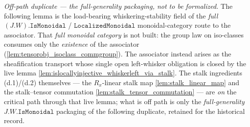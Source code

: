 \emph{Off-path duplicate --- the full-generality packaging, not to be formalized.}
The following lemma is the load-bearing whiskering-stability field of the \emph{full}
\((J.W).\mathtt{IsMonoidal}\) / \(\mathtt{LocalizedMonoidal}\) monoidal-category route
to the associator. That \emph{full monoidal category} is not built: the group law on
iso-classes consumes only the \emph{existence} of the associator
(\cref{lem:tensorobj_isoclass_commgroup}). The associator instead arises as the
sheafification transport whose single open left-whisker obligation is closed by the
live lemma \cref{lem:islocallyinjective_whiskerleft_via_stalk}. The stalk ingredients
(d.1)/(d.2) themselves --- the \(R_x\)-linear stalk map \cref{lem:stalk_linear_map}
and the stalk--tensor commutation \cref{lem:stalk_tensor_commutation} --- are
\emph{on} the critical path through that live lemma; what is off path is only the
\emph{full-generality} \(J.W.\mathtt{IsMonoidal}\) packaging of the following
duplicate, retained for the historical record.

